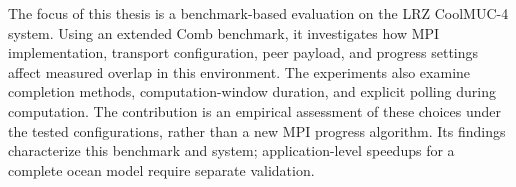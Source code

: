 The focus of this thesis is a benchmark-based evaluation on the LRZ
CoolMUC-4 system. Using an extended Comb benchmark, it investigates how
MPI implementation, transport configuration, peer payload, and progress
settings affect measured overlap in this environment. The experiments
also examine completion methods, computation-window duration, and explicit
polling during computation. The contribution is an empirical assessment
of these choices under the tested configurations, rather than a new MPI
progress algorithm. Its findings characterize this benchmark and system;
application-level speedups for a complete ocean model require separate
validation.
